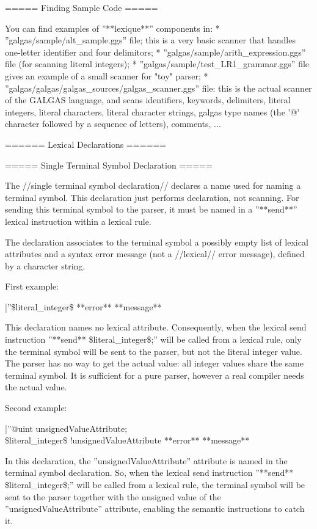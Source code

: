 {===== Finding Sample Code =====

You can find examples of ''**lexique**'' components in:
  * ''galgas/sample/alt\_sample.ggs'' file; this is a very basic scanner that handles one-letter identifier and four delimitors;
  * ''galgas/sample/arith\_expression.ggs'' file (for scanning literal integers); 
  * ''galgas/sample/test\_LR1\_grammar.ggs'' file gives an example of a small scanner for "toy" parser;
  * ''galgas/galgas/galgas\_sources/galgas\_scanner.ggs'' file: this is the actual scanner of the GALGAS language, and scans identifiers, keywords, delimiters, literal integers, literal characters, literal character strings, galgas type names (the '@' character followed by a sequence of letters), comments, ...   

====== Lexical Declarations ======

===== Single Terminal Symbol Declaration =====

The //single terminal symbol declaration// declares a name used for naming a terminal symbol. This declaration just performs declaration, not scanning. For sending this terminal symbol to the parser, it must be named in a ''**send**'' lexical instruction within a lexical rule.

The declaration associates to the terminal symbol a possibly empty list of lexical attributes and a syntax error message (not a //lexical// error message), defined by a character string.

First example:

|''\$literal\_integer\$ **error** **message** %

This declaration names no lexical attribute. Consequently, when the lexical send instruction ''**send** \$literal\_integer\$;'' will be called from a lexical rule, only the terminal symbol will be sent to the parser, but not the literal integer value. The parser has no way to get the actual value: all integer values share the same terminal symbol. It is sufficient for a pure parser, however a real compiler needs the actual value.

Second example:

|''@uint unsignedValueAttribute;\\ 
\$literal\_integer\$ !unsignedValueAttribute **error** **message** %

In this declaration, the ''unsignedValueAttribute'' attribute is named in the terminal symbol declaration. So, when the lexical send instruction ''**send** \$literal\_integer\$;'' will be called from a lexical rule, the terminal symbol will be sent to the parser together with the unsigned value of the ''unsignedValueAttribute'' attribute, enabling the semantic instructions to catch it.

}
